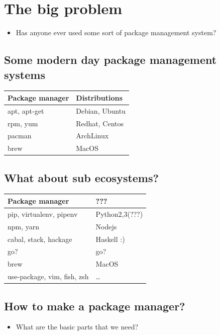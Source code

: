 \documentclass[11pt]{article}
\begin{document}
\section{The big problem}
\label{sec:org4854334}
\begin{itemize}
\item Has anyone ever used some sort of package management system?
\end{itemize}
\subsection{Some modern day package management systems}
\label{sec:orga736166}
\begin{center}
\begin{tabular}{ll}
Package manager & Distributions\\
\hline
apt, apt-get & Debian, Ubuntu\\
rpm, yum & Redhat, Centos\\
pacman & ArchLinux\\
brew & MacOS\\
\end{tabular}
\end{center}
\subsection{What about sub ecosystems?}
\label{sec:org479c34c}
\begin{center}
\begin{tabular}{ll}
Package manager & ???\\
\hline
pip, virtualenv, pipenv & Python2,3(???)\\
npm, yarn & Nodejs\\
cabal, stack, hackage & Haskell :)\\
go? & go?\\
brew & MacOS\\
use-package, vim, fish, zsh & \ldots{}\\
\end{tabular}
\end{center}
\subsection{How to make a package manager?}
\label{sec:org1da1c09}
\begin{itemize}
\item What are the basic parts that we need?
\end{itemize}
\end{document}
